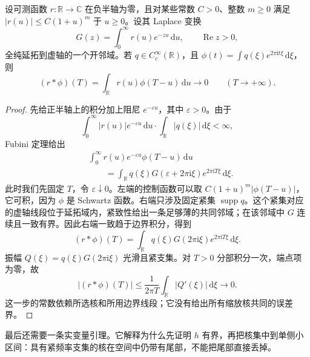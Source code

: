 \begin{lemma}[解析边界给出固定核平均]
\label{b3:lem:27-boundary-average}
设可测函数 \(r:\mathbb R\to\mathbb C\) 在负半轴为零，且对某些常数 \(C>0\)、整数 \(m\ge0\) 满足 \(|r(u)|\le C(1+u)^m\) 于 \(u\ge0\)。设其 Laplace 变换
\[
 G(z)=\int_0^\infty r(u)e^{-zu}\,\mathrm du,
 \qquad\operatorname{Re}z>0,
\]
全纯延拓到虚轴的一个开邻域。若 \(q\in C_c^\infty(\mathbb R)\)，且
\(\phi(t)=\int q(\xi)e^{2\pi\mathrm it\xi}\,\mathrm d\xi\)，则
\[
 (r*\phi)(T)=\int_{\mathbb R}r(u)\phi(T-u)\,\mathrm du
 \longrightarrow0\qquad(T\to+\infty).
\]
\end{lemma}
\begin{proof}
先给正半轴上的积分加上阻尼 \(e^{-\varepsilon u}\)，其中 \(\varepsilon>0\)。由于
\[
 \int_0^\infty |r(u)|e^{-\varepsilon u}\,\mathrm du
 \cdot\int_{\mathbb R}|q(\xi)|\,\mathrm d\xi<\infty,
\]
Fubini 定理给出
\begin{equation}
\label{b3:eq:27-damped-average}
 \begin{aligned}
 &\int_0^\infty r(u)e^{-\varepsilon u}\phi(T-u)\,\mathrm du\\
 &\qquad=\int_{\mathbb R}q(\xi)G(\varepsilon+2\pi\mathrm i\xi)
                         e^{2\pi\mathrm iT\xi}\,\mathrm d\xi.
 \end{aligned}
\end{equation}
此时我们先固定 \(T\)，令 \(\varepsilon\downarrow0\)。左端的控制函数可以取 \(C(1+u)^m|\phi(T-u)|\)，它可积，因为 \(\phi\) 是 Schwartz 函数。右端只涉及固定紧集 \(\operatorname{supp}q\)。这个紧集对应的虚轴线段位于延拓域内，紧致性给出一条足够薄的共同邻域；在该邻域中 \(G\) 连续且一致有界。因此右端一致趋于边界积分，得到
\[
 (r*\phi)(T)=\int_{\mathbb R}
       q(\xi)G(2\pi\mathrm i\xi)e^{2\pi\mathrm iT\xi}\,\mathrm d\xi.
\]
振幅 \(Q(\xi)=q(\xi)G(2\pi\mathrm i\xi)\) 光滑且紧支集。对 \(T>0\) 分部积分一次，端点项为零，故
\[
 |(r*\phi)(T)|
 \le\frac1{2\pi T}\int_{\mathbb R}|Q'(\xi)|\,\mathrm d\xi
 \longrightarrow0.
\]
这一步的常数依赖所选核和所用边界线段；它没有给出所有缩放核共同的误差界。
\end{proof}

最后还需要一条实变量引理。它解释为什么先证明 \(h\) 有界，再把核集中到单侧小区间：具有紧频率支集的核在空间中仍带有尾部，不能把尾部直接丢掉。

